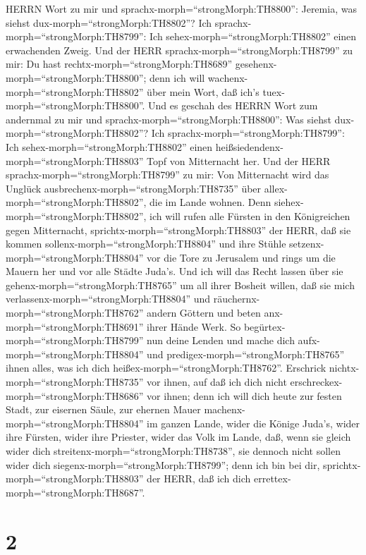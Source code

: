 HERRN Wort zu mir und sprachx-morph=``strongMorph:TH8800'': Jeremia, was
siehst dux-morph=``strongMorph:TH8802''? Ich
sprachx-morph=``strongMorph:TH8799'': Ich
sehex-morph=``strongMorph:TH8802'' einen erwachenden Zweig.
 Und der HERR sprachx-morph=``strongMorph:TH8799'' zu mir:
Du hast rechtx-morph=``strongMorph:TH8689''
gesehenx-morph=``strongMorph:TH8800''; denn ich will
wachenx-morph=``strongMorph:TH8802'' über mein Wort, daß ich's
tuex-morph=``strongMorph:TH8800''.  Und es geschah des
HERRN Wort zum andernmal zu mir und
sprachx-morph=``strongMorph:TH8800'': Was siehst
dux-morph=``strongMorph:TH8802''? Ich
sprachx-morph=``strongMorph:TH8799'': Ich
sehex-morph=``strongMorph:TH8802'' einen
heißsiedendenx-morph=``strongMorph:TH8803'' Topf von Mitternacht her.
 Und der HERR sprachx-morph=``strongMorph:TH8799'' zu mir:
Von Mitternacht wird das Unglück
ausbrechenx-morph=``strongMorph:TH8735'' über
allex-morph=``strongMorph:TH8802'', die im Lande wohnen. 
Denn siehex-morph=``strongMorph:TH8802'', ich will rufen alle Fürsten in
den Königreichen gegen Mitternacht,
sprichtx-morph=``strongMorph:TH8803'' der HERR, daß sie kommen
sollenx-morph=``strongMorph:TH8804'' und ihre Stühle
setzenx-morph=``strongMorph:TH8804'' vor die Tore zu Jerusalem und rings
um die Mauern her und vor alle Städte Juda's.  Und ich will
das Recht lassen über sie gehenx-morph=``strongMorph:TH8765'' um all
ihrer Bosheit willen, daß sie mich
verlassenx-morph=``strongMorph:TH8804'' und
räuchernx-morph=``strongMorph:TH8762'' andern Göttern und beten
anx-morph=``strongMorph:TH8691'' ihrer Hände Werk.  So
begürtex-morph=``strongMorph:TH8799'' nun deine Lenden und mache dich
aufx-morph=``strongMorph:TH8804'' und
predigex-morph=``strongMorph:TH8765'' ihnen alles, was ich dich
heißex-morph=``strongMorph:TH8762''. Erschrick
nichtx-morph=``strongMorph:TH8735'' vor ihnen, auf daß ich dich nicht
erschreckex-morph=``strongMorph:TH8686'' vor ihnen;  denn
ich will dich heute zur festen Stadt, zur eisernen Säule, zur ehernen
Mauer machenx-morph=``strongMorph:TH8804'' im ganzen Lande, wider die
Könige Juda's, wider ihre Fürsten, wider ihre Priester, wider das Volk
im Lande,  daß, wenn sie gleich wider dich
streitenx-morph=``strongMorph:TH8738'', sie dennoch nicht sollen wider
dich siegenx-morph=``strongMorph:TH8799''; denn ich bin bei dir,
sprichtx-morph=``strongMorph:TH8803'' der HERR, daß ich dich
errettex-morph=``strongMorph:TH8687''.

\hypertarget{section-1}{%
\section{2}\label{section-1}}

